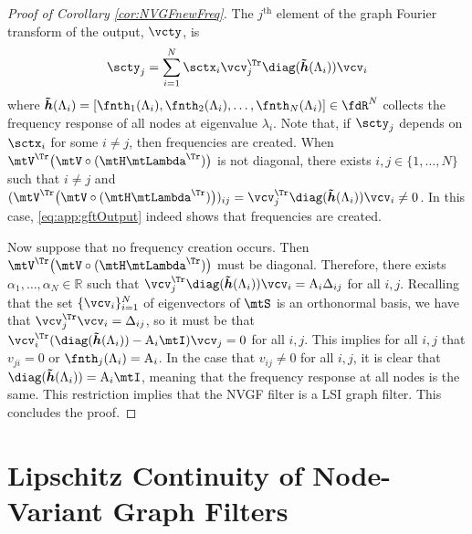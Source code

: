 \begin{proof}[Proof of Corollary \ref{cor:NVGFnewFreq}]
The $j^{\text{th}}$ element of the graph Fourier transform of the output, $\vcty$, is
%
\begin{equation} \label{eq:app:gftOutput}
    \scty_{j}%
    = \sum_{i=1}^{N} \sctx_{i} \vcv_{j}^{\Tr} \diag(\vcfnth(\lambda_{i})) \vcv_{i}
\end{equation}
%
where $\vcfnth(\lambda_i) = [\fnth_{1}(\lambda_i),\fnth_{2}(\lambda_i),\dots,\fnth_{N}(\lambda_i)] \in \fdR^{N}$ collects the frequency response of all nodes at eigenvalue $\lambda_{i}$. Note that, if $\scty_{j}$ depends on $\sctx_{i}$ for some $i \neq j$, then frequencies are created. When $\mtV^{\Tr} \big( \mtV \circ (\mtH \mtLambda^{\Tr}) \big)$ is not diagonal, there exists $i,j\in\{1,\ldots,N\}$ such that $i\ne j$ and $(\mtV^{\Tr} \big( \mtV \circ (\mtH \mtLambda^{\Tr}) \big))_{ij} = \vcv_{j}^{\Tr} \diag(\vcfnth(\lambda_{i})) \vcv_{i} \ne 0$. In this case, \eqref{eq:app:gftOutput} indeed shows that frequencies are created.

Now suppose that no frequency creation occurs. Then $\mtV^{\Tr} \big( \mtV \circ (\mtH \mtLambda^{\Tr}) \big)$ must be diagonal. Therefore, there exists $\alpha_1,\ldots,\alpha_N\in\mathbb{R}$ such that $\vcv_{j}^{\Tr} \diag(\vcfnth(\lambda_{i})) \vcv_{i} = \alpha_{i} \delta_{ij}$ for all $i,j$. Recalling that the set $\{\vcv_{i}\}_{i=1}^N$ of eigenvectors of $\mtS$ is an orthonormal basis, we have that $\vcv_{j}^{\Tr} \vcv_{i} = \delta_{ij}$, so it must be that $\vcv_{i}^{\Tr}(\diag(\vcfnth(\lambda_{i}))-\alpha_i \mtI) \vcv_{j} = 0$ for all $i,j$. This implies for all $i,j$ that $v_{ji}=0$ or $\fnth_{j}(\lambda_i)=\alpha_i$. In the case that $v_{ij}\ne 0$ for all $i,j$, it is clear that $\diag(\vcfnth(\lambda_{i})) = \alpha_{i} \mtI$, meaning that the frequency response at all nodes is the same. This restriction implies that the NVGF filter is a LSI graph filter. This concludes the proof.
\end{proof}



\section{Lipschitz Continuity of Node-Variant Graph Filters}

